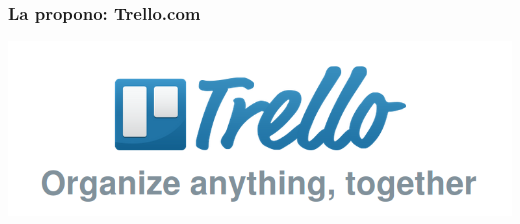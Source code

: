    
  \begin{frame}
    \frametitle{La propono: Trello.com}
    \begin{center}
    	\includegraphics[scale=0.4]{bildoj/trello}
    \end{center}    
  \end{frame}
  

